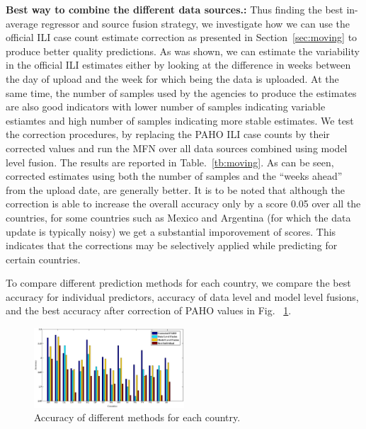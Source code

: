 {\noindent \textbf{Best way to combine the different data sources.: }} Thus finding the 
best in-average regressor and source fusion strategy, we investigate how we can use the 
official ILI case count estimate correction as presented in Section~\ref{sec:moving} to 
produce better quality predictions. As was shown, we can estimate the variability in the 
official ILI estimates either by looking at the difference in weeks between the day of upload 
and the week for which being the data is uploaded. At the same time, the number of samples used 
by the agencies to produce the estimates are also good indicators with lower number of samples
indicating variable estiamtes and high number of samples indicating more stable estimates. 
We test the correction procedures, by replacing the PAHO ILI case counts by their corrected values
and run the MFN over all data sources combined using model level fusion.
The results are reported in Table.~\ref{tb:moving}. As can be seen, corrected estimates 
using both the number of samples and 
the ``weeks ahead'' from the upload date, are generally better. It is to be noted that although
the correction is 
able to increase the overall accuracy only by a score 0.05 over all the countries, 
for some countries such as Mexico and Argentina (for which the data update is typically noisy) we get 
a substantial imporovement of scores. This indicates that the corrections may be selectively applied 
while predicting for certain countries. 

To compare different prediction methods for each country, we compare the best accuracy for individual predictors, accuracy of data level and model level fusions, and the best accuracy after correction of PAHO values in Fig. ~\ref{fig:accuracies}.

\begin{figure}[h]
  \centering
    \includegraphics[width=0.5\textwidth]{fig/accs.eps}
  \caption{Accuracy of different methods for each country.}
  \label{fig:accuracies}
\end{figure}


